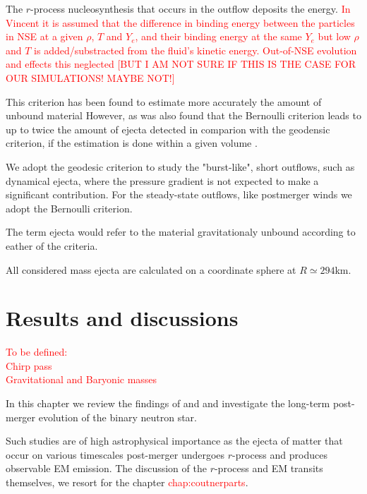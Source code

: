 \documentclass[11pt,a4paper,headinclude=true,DIV=14,BCOR=8mm,chapterprefix,listof=totoc,twoside,openright,abstracton]{scrbook}
\newcommand{\red}[1]{\textcolor{red}{#1}}
\newcommand{\rproc}{$r$-process}
\newcommand{\pmerg}{post-merger}
\begin{document}
The $r$-process nucleosynthesis that occurs in the outflow deposits the energy.
\red{In Vincent it is assumed that the difference in binding energy between the 
particles in NSE at a given $\rho$, $T$ and $Y_e$, and their binding energy at
the same $Y_e$ but low $\rho$ and $T$ is added/substracted from the fluid's kinetic energy.
Out-of-NSE evolution and effects this neglected \citep[][see]{Foucart:2016vxd}
[BUT I AM NOT SURE IF THIS IS THE CASE FOR OUR SIMULATIONS! MAYBE NOT!]}

This criterion has been found to estimate more accurately the amount of unbound material \citep{Foucart:2015gaa}
However, as was also found that the Bernoulli criterion leads to up to twice the amount of ejecta detected in comparion with the geodensic criterion, if the estimation is done within a given volume \citep{Kastaun:2014fna}.

We adopt the geodesic criterion to study the "burst-like", short outflows,
such as dynamical ejecta, where the pressure gradient is not expected to make a significant contribution.
For the steady-state outflows, like postmerger winds we adopt the Bernoulli criterion.

The term ejecta would refer to the material gravitationaly unbound according to eather of the criteria.




All considered mass ejecta are calculated on a coordinate sphere at $R \simeq 294$km. 



\chapter{Results and discussions}

\red{
    To be defined: \\
    Chirp pass \\
    Gravitational and Baryonic masses
}

In this chapter we review the findings of \citet{Nedora:2019jhl} and \citet{Nedora:2020pak}
and investigate the long-term \pmerg{} evolution of the binary neutron star. 

Such studies are of high astrophysical importance as the ejecta of matter that occur 
on various timescales \pmerg{} undergoes \rproc{} and produces observable EM emission. 
The discussion of the \rproc{} and EM transits themselves, we resort for the chapter \red{chap:coutnerparts}.
\end{document}
